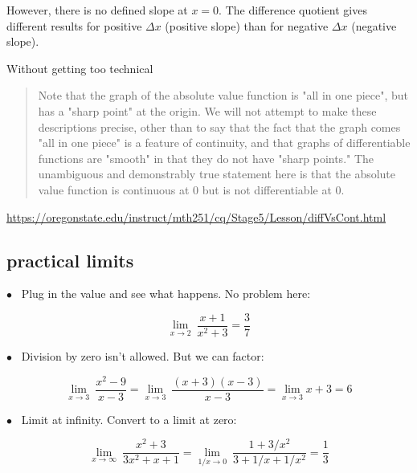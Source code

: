 \documentclass[11pt, oneside]{article}
\begin{document}
However, there is no defined slope at $x=0$.  The difference quotient gives different results for positive $\Delta x$ (positive slope) than for negative $\Delta x$ (negative slope).

Without getting too technical

\begin{quote}Note that the graph of the absolute value function is "all in one piece", but has a "sharp point" at the origin. We will not attempt to make these descriptions precise, other than to say that the fact that the graph comes "all in one piece" is a feature of continuity, and that graphs of differentiable functions are "smooth" in that they do not have "sharp points." The unambiguous and demonstrably true statement here is that the absolute value function is continuous at 0 but is not differentiable at 0.\end{quote}

\url{https://oregonstate.edu/instruct/mth251/cq/Stage5/Lesson/diffVsCont.html}

\subsection*{practical limits}

$\bullet$ \ Plug in the value and see what happens.  No problem here:

\[ \lim_{x \rightarrow 2} \ \frac{x + 1}{x^2 + 3} = \frac{3}{7} \]

$\bullet$ \ Division by zero isn't allowed.  But we can factor:

\[ \lim_{x \rightarrow 3} \ \frac{x^2 - 9}{x - 3} = \lim_{x \rightarrow 3} \ \frac{(x + 3)(x - 3)}{x - 3} = \lim_{x \rightarrow 3} x + 3 = 6 \]

$\bullet$ \ Limit at infinity.  Convert to a limit at zero:

\[ \lim_{x \rightarrow \infty} \ \frac{x^2 + 3}{3x^2 + x + 1}= \lim_{1/x \rightarrow 0} \ \frac{1 + 3/x^2}{3 + 1/x + 1/x^2}  = \frac{1}{3} \]
\end{document}
